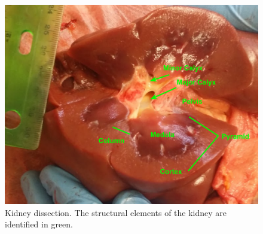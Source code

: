 \documentclass[12pt]{article}
\begin{document}
\begin{figure}[H]
	
	\centering	
	\includegraphics[width = 1\textwidth]{Figures/Kidney2.png}
	\caption{Kidney dissection. The structural elements of the kidney are identified in green.}
	\label{fig:K2}
\end{figure}
\end{document}
